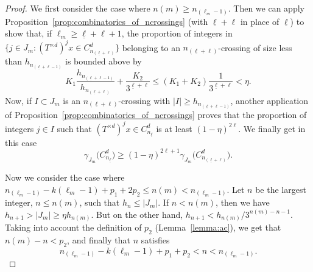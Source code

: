 \documentclass[AHL,Unicode,longabstracts]{cedram}
\newcommand{\cd}{C^{d}}
\newcommand{\td}{T^{\times d}}
\newcommand{\lb}{\underline{\ell}}
\begin{document}
\begin{proof}
We first consider the case where $n(m)\ge n_{(\ell_m-1)}$. Then we can apply Proposition~\ref{prop:combinatorics_of_ncrossings} (with $\lb+\ell$ in place of $\lb$) to show that, if $\ell_m\ge \lb+\ell+1$, the proportion of integers in $\{j\in J_m: (\td)^jx\in \cd_{n_{(\lb+\ell)}}\}$ belonging to an $n_{(\lb + \ell)}$-crossing of size less than $h_{n_{(\lb+\ell-1)}}$ is bounded above by
\[
K_1 \frac{h_{n_{(\lb+\ell-1)}}}{h_{n_{(\lb+\ell)}}} + \frac{K_2}{3^{\lb+\ell}} \le (K_1+K_2)\frac{1}{3^{\lb+\ell}}<\eta.
\]
Now, if $I\subset J_m$ is an $n_{(\lb+\ell)}$-crossing with $|I|\ge h_{n_{(\lb+\ell-1)}}$, another application of Proposition~\ref{prop:combinatorics_of_ncrossings} proves that the proportion of integers $j\in I$ such that $(\td)^jx\in \cd_{n_{\lb}}$ is at least $(1-\eta)^{2\ell}$. We finally get in this case
\begin{equation}\label{eq:lemma4.4case1}
\gamma_{J_m}\bigl(\cd_{n_{\lb}}\bigr) \ge (1-\eta)^{2\ell+1} \gamma_{J_m} \bigl(\cd_{n_{(\lb+\ell)}}\bigr).
\end{equation}

Now we consider the case where $n_{(\ell_m-1)}-k(\ell_m-1) + p_1+ 2p_2 \le n(m)< n_{(\ell_m-1)}$. Let $n$ be the largest integer, $n\le n(m)$, such that $h_n\le |J_m|$. If $n<n(m)$, then we have $h_{n+1}> |J_m|\ge \eta h_{n(m)}$. But on the other hand, $h_{n+1}<h_{n(m)}/3^{n(m)-n-1}$. Taking into account the definition of $p_2$ (Lemma~\ref{lemma:ac}), we get that $n(m)-n<p_2$, and finally that $n$ satisfies
\[
n_{(\ell_m-1)}-k(\ell_m-1) + p_1+ p_2 < n < n_{(\ell_m-1)}.
\]


\end{proof}
\end{document}
